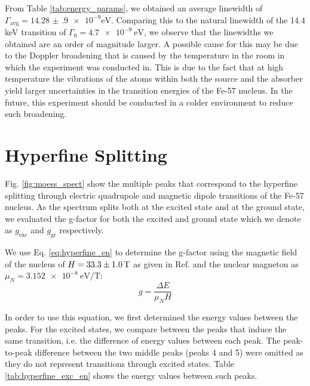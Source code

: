 \documentclass[a4paper]{report}
\numberwithin{equation}{section}
\begin{document}
From Table \ref{tab:energy_params}, we obtained an average linewidth of $\Gamma_{\mathrm{avg}} = \num[{scientific-notation = true}]{14.28(90)e-9}\si{\electronvolt}$. 
Comparing this to the natural linewidth of the 14.4 keV transition of $\Gamma_0 = \SI{4.7e-9}{\electronvolt}$, we observe that the linewidths we obtained are an 
order of magnitude larger. A possible cause for this may be due to the Doppler broadening that is caused by the temperature in the room
in which the experiment was conducted in. This is due to the fact that at high temperature the vibrations of the atoms within both the source and 
the absorber yield larger uncertainties in the transition energies of the Fe-57 nucleus. In the future, this experiment should be 
conducted in a colder environment to reduce such broadening.\par 

\section{Hyperfine Splitting}

Fig. \ref{fig:moess_spect} show the multiple peaks that correspond to the hyperfine splitting through electric quadrupole and 
magnetic dipole transitions of the Fe-57 nucleus. As the spectrum splits both at the excited state and at the ground state, we evaluated
the g-factor for both the excited and ground state which we denote as $g_{\mathrm{exc}}$ and $g_{\mathrm{gr}}$ respectively. \par

We use Eq. \ref{eq:hyperfine_en} to determine the g-factor using the magnetic field of the nucleus of $H = \SI{33.3 \pm 1.0}{\tesla}$ as given in Ref. \cite{k2212016}
and the nuclear magneton as $\mu_N = \SI{3.152e-8}{\electronvolt\per\tesla}$:
\begin{equation}
    g = \frac{\Delta E}{\mu_N H}
    \label{eq:hyperfine_gfac}
\end{equation}

In order to use this equation, we first determined the energy values between the peaks. For the excited states, we compare between the 
peaks that induce the same transition, i.e. the difference of energy values between each peak. The peak-to-peak difference between the 
two middle peaks (peaks 4 and 5) were omitted as they do not represent transitions through excited states. Table \ref{tab:hyperfine_exc_en} shows the energy values between such peaks.  
\end{document}
